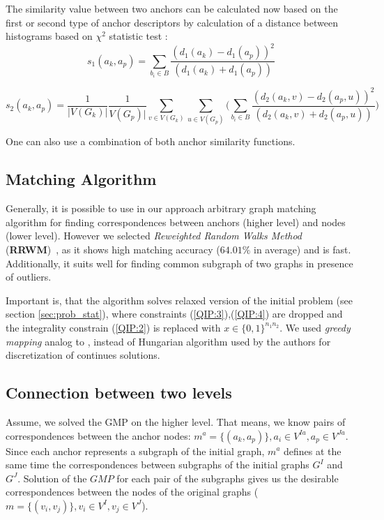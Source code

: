 \documentclass[
	fontsize=12pt,
	paper=a4,
	twoside=false,
	numbers=noenddot,
	plainheadsepline,
	toc=listof,
	toc=bibliography
]{scrartcl}
\begin{document}
The similarity value between two anchors can be calculated now based on the first or second type of anchor descriptors by calculation of a distance between histograms based on $\chi^2$ statistic test \cite{Weken2004_ChiSqTest}:
\begin{equation}
s_1(a_k, a_p) = \sum_{b_i\in B}\frac{(d_1(a_k)-d_1(a_p))^2}{(d_1(a_k)+d_1(a_p))}
\end{equation}

\begin{equation}
s_2(a_k, a_p) = \frac{1}{|V(G_k)|}\frac{1}{V(G_p)|}\sum_{v\in V(G_k)}\sum_{u\in V(G_p)} \big(\sum_{b_i\in B}\frac{(d_2(a_k,v)-d_2(a_p,u))^2}{(d_2(a_k,v)+d_2(a_p,u))}\big)
\end{equation}

One can also use a combination of both anchor similarity functions.


\subsection{Matching Algorithm}

Generally, it is possible to use in our approach arbitrary graph matching algorithm for finding correspondences between anchors (higher level) and nodes (lower level). However we selected \emph{Reweighted Random Walks Method} (\textbf{RRWM})~\cite{Cho2010_RRWM}, as it shows high matching accuracy ($64.01\%$ in average) and is fast. Additionally, it	 suits well for finding common subgraph of two graphs in presence of outliers.

Important is, that the algorithm solves relaxed version of the initial problem (see section \ref{sec:prob_stat}), where constraints (\ref{QIP:3}),(\ref{QIP:4}) are dropped and the integrality constrain (\ref{QIP:2}) is replaced with $x\in \{0,1\}^{n_1n_2}$. We used \emph{greedy mapping} analog to \cite{Leordeanu2005}, instead of Hungarian algorithm used by the authors for discretization of continues solutions.

\subsection{Connection between two levels}
Assume, we solved the GMP on the higher level. That means, we know pairs of correspondences between the anchor nodes: $m^a = \{(a_k, a_p)\}, a_i\in V^{Ia}, a_p\in V^{Ja}$. Since each anchor represents a subgraph of the initial graph, $m^a$ defines at the same time the correspondences between subgraphs of the initial graphs $G^I$ and $G^J$. Solution of the $GMP$ for each pair of the subgraphs gives us the desirable correspondences between the nodes of the original graphs ($m = \{(v_i, v_j)\}, v_i\in V^{I}, v_j\in V^{J}$).
\end{document}
